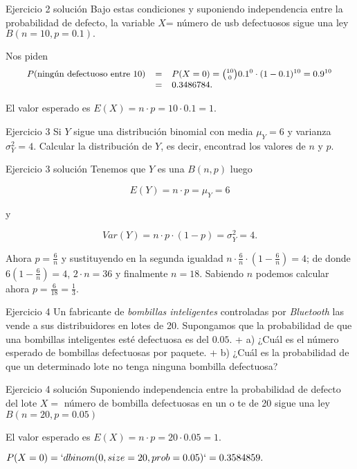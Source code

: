\documentclass[
  ignorenonframetext,
]{beamer}
\begin{document}
\begin{frame}{Ejercicio 2 solución}
\protect\hypertarget{ejercicio-2-soluciuxf3n}{}
Bajo estas condiciones y suponiendo independencia entre la probabilidad
de defecto, la variable \(X\)= número de usb defectuosos sigue una ley
\(B(n=10,p=0.1).\)

Nos piden \[
\small{
\begin{array}{lll}
P(\mbox{ningún defectuoso entre 10})&=& P(X=0)={10\choose 0} 0.1^0\cdot(1-0.1)^{10}=0.9^{10} \\&=&
0.3486784.
\end{array}
}
\]

El valor esperado es \(E(X)=n\cdot p =10\cdot 0.1=1.\)
\end{frame}

\begin{frame}{Ejercicio 3}
\protect\hypertarget{ejercicio-3}{}
Si \(Y\) sigue una distribución binomial con media \(\mu_Y=6\) y
varianza \(\sigma_Y^2=4\). Calcular la distribución de \(Y\), es decir,
encontrad los valores de \(n\) y \(p\).
\end{frame}

\begin{frame}{Ejercicio 3 solución}
\protect\hypertarget{ejercicio-3-soluciuxf3n}{}
Tenemos que \(Y\) es una \(B(n,p)\) luego

\[E(Y)=n\cdot p=\mu_Y=6\]

y

\[Var(Y)=n\cdot p\cdot (1-p)=\sigma_Y^2=4.\]

Ahora \(p=\frac{6}{n}\) y sustituyendo en la segunda igualdad
\(n\cdot \frac{6}{n} \cdot (1-\frac{6}{n})=4\); de donde
\(6 \left(1-\frac6n\right)= 4\), \(2 \cdot n =36\) y finalmente
\(n=18\). Sabiendo \(n\) podemos calcular ahora
\(p=\frac{6}{18}=\frac13.\)
\end{frame}

\begin{frame}{Ejercicio 4}
\protect\hypertarget{ejercicio-4}{}
Un fabricante de \emph{bombillas inteligentes} controladas por
\emph{Bluetooth} las vende a sus distribuidores en lotes de 20.
Supongamos que la probabilidad de que una bombillas inteligentes esté
defectuosa es del \(0.05\). + a) ¿Cuál es el número esperado de
bombillas defectuosas por paquete. + b) ¿Cuál es la probabilidad de que
un determinado lote no tenga ninguna bombilla defectuosa?
\end{frame}

\begin{frame}{Ejercicio 4 solución}
\protect\hypertarget{ejercicio-4-soluciuxf3n}{}
Suponiendo independencia entre la probabilidad de defecto del lote
\(X=\) número de bombilla defectuosas en un o te de 20 sigue una ley
\(B(n=20,p=0.05)\)

El valor esperado es \(E(X)=n\cdot p= 20\cdot 0.05=1.\)

\(P(X=0)=`dbinom(0,size=20,prob=0.05)`=0.3584859.\)
\end{frame}
\end{document}
